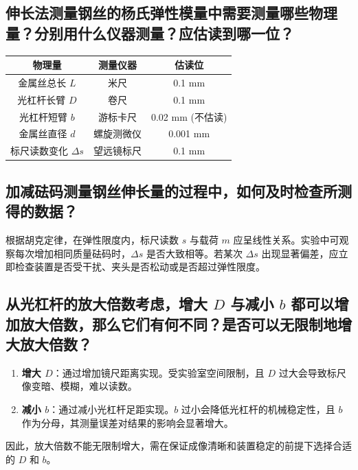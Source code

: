\documentclass[]{../../templates/Report}%
\begin{document}
\begin{fullreportonly}
    \subsection{伸长法测量钢丝的杨氏弹性模量中需要测量哪些物理量？分别用什么仪器测量？应估读到哪一位？}
    \begin{table}[H]
        \centering
        \begin{tabular}{ccc}
            \toprule
            物理量               & 测量仪器  & 估读位           \\
            \midrule
            金属丝总长 $L$         & 米尺    & 0.1 mm        \\
            光杠杆长臂 $D$         & 卷尺    & 0.1 mm        \\
            光杠杆短臂 $b$         & 游标卡尺  & 0.02 mm (不估读) \\
            金属丝直径 $d$         & 螺旋测微仪 & 0.001 mm      \\
            标尺读数变化 $\Delta s$ & 望远镜标尺 & 0.1 mm        \\
            \bottomrule
        \end{tabular}
    \end{table}

    \subsection{加减砝码测量钢丝伸长量的过程中，如何及时检查所测得的数据？}
    根据胡克定律，在弹性限度内，标尺读数 $s$ 与载荷 $m$ 应呈线性关系。实验中可观察每次增加相同质量砝码时，$\Delta s$ 是否大致相等。若某次 $\Delta s$ 出现显著偏差，应立即检查装置是否受干扰、夹头是否松动或是否超过弹性限度。

    \subsection{从光杠杆的放大倍数考虑，增大 $D$ 与减小 $b$ 都可以增加放大倍数，那么它们有何不同？是否可以无限制地增大放大倍数？}
    \begin{enumerate}
        \item \textbf{增大 $D$}：通过增加镜尺距离实现。受实验室空间限制，且 $D$ 过大会导致标尺像变暗、模糊，难以读数。
        \item \textbf{减小 $b$}：通过减小光杠杆足距实现。$b$ 过小会降低光杠杆的机械稳定性，且 $b$ 作为分母，其测量误差对结果的影响会显著增大。
    \end{enumerate}
    因此，放大倍数不能无限制增大，需在保证成像清晰和装置稳定的前提下选择合适的 $D$ 和 $b$。
\end{fullreportonly}
\insertnotes
\end{document}
